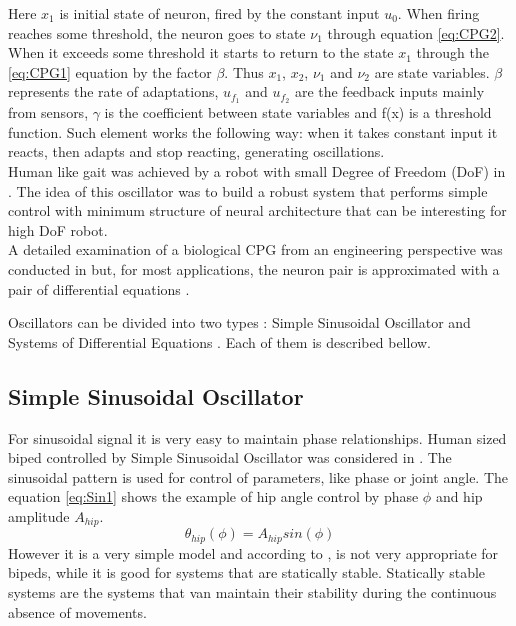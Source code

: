 \documentclass[12pt,a4paper]{report}
\begin{document}
		Here $x_1$  is initial state of neuron, fired by the constant input $u_0$. When firing reaches some threshold, the neuron goes to state $\nu_1$ through equation \ref{eq:CPG2}. When it exceeds some threshold it starts to return to the state $x_1$ through the \ref{eq:CPG1} equation by the factor $\beta$. Thus $x_1$, $x_2$, $\nu_1$ and $\nu_2$ are state variables. $\beta$ represents the rate of adaptations, $u_{f_1}$ and $u_{f_2}$ are the feedback inputs mainly from sensors, $\gamma$ is the coefficient between state variables and f(x) is a threshold function. Such element works the following way: when it takes constant input it reacts, then adapts and stop reacting, generating oscillations. \\ Human like gait was achieved by a robot with small Degree of Freedom (DoF) in \cite{miyakoshi1998three}. The idea of this oscillator was to build a robust system that performs simple control with minimum structure of neural architecture that can be interesting for high DoF robot.\\
		A detailed examination of a biological CPG from an engineering perspective was conducted in \cite{zhu2006central} but, for most applications, the neuron pair is approximated with a pair of differential equations \cite{wright2014intelligent}.

		Oscillators can be divided into two types : Simple Sinusoidal Oscillator and Systems of Differential Equations \cite{wright2014intelligent}. Each of them is described bellow.

		\subsection{Simple Sinusoidal Oscillator}
			For sinusoidal signal it is very easy to maintain phase relationships. Human sized biped controlled by Simple Sinusoidal Oscillator was considered in \cite{morimoto2008biologically}. The sinusoidal pattern is used for control of parameters, like phase or joint angle. The equation \ref{eq:Sin1} shows the example of hip angle control by phase $\phi$ and hip amplitude $A_{hip}$.
			\begin{equation}\label{eq:Sin1}
				\theta_{hip} (\phi) = A_{hip} sin(\phi) 
			\end{equation}
 			However it is a very simple model and according to \cite{wright2014intelligent}, is not very appropriate for bipeds, while it is good for systems that are statically stable. Statically stable systems are the systems that van maintain their stability during the continuous absence of movements.
\end{document}

